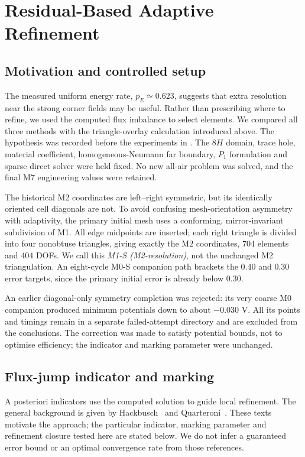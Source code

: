 \section{Residual-Based Adaptive Refinement}
\label{sec:residual-adaptive}
\subsection{Motivation and controlled setup}
The measured uniform energy rate, $p_E\simeq0.623$, suggests that extra resolution near the strong corner fields may be useful. Rather than prescribing where to refine, we used the computed flux imbalance to select elements. We compared all three methods with the triangle-overlay calculation introduced above. The hypothesis was recorded before the experiments in . The $8H$ domain, trace hole, material coefficient, homogeneous-Neumann far boundary, $P_1$ formulation and sparse direct solver were held fixed. No new all-air problem was solved, and the final M7 engineering values were retained.

The historical M2 coordinates are left--right symmetric, but its identically oriented cell diagonals are not. To avoid confusing mesh-orientation asymmetry with adaptivity, the primary initial mesh uses a conforming, mirror-invariant subdivision of M1. All edge midpoints are inserted; each right triangle is divided into four nonobtuse triangles, giving exactly the M2 coordinates, $704$ elements and $404$ DOFs. We call this \emph{M1-S (M2-resolution)}, not the unchanged M2 triangulation. An eight-cycle M0-S companion path brackets the $0.40$ and $0.30$ error targets, since the primary initial error is already below $0.30$.

An earlier diagonal-only symmetry completion was rejected: its very coarse M0 companion produced minimum potentials down to about $-0.030$ V. All its points and timings remain in a separate failed-attempt directory and are excluded from the conclusions. The correction was made to satisfy potential bounds, not to optimise efficiency; the indicator and marking parameter were unchanged.

\subsection{Flux-jump indicator and marking}
A posteriori indicators use the computed solution to guide local refinement. The general background is given by Hackbusch~\cite[Sec.~8.7]{hackbusch2017} and Quarteroni~\cite[Sec.~4.6]{quarteroni2017}. These texts motivate the approach; the particular indicator, marking parameter and refinement closure tested here are stated below. We do not infer a guaranteed error bound or an optimal convergence rate from those references.


